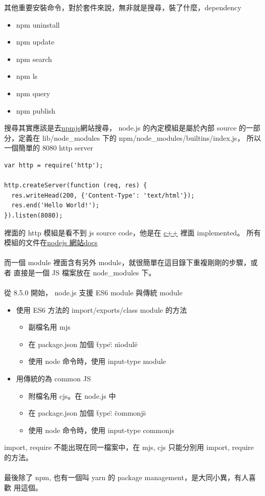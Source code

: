   其他重要安裝命令，對於套件來說，無非就是搜尋，裝了什麼，dependency
  \begin{itemize}
    \item npm uninstall
    \item npm update
    \item npm search
    \item npm ls
    \item npm query
    \item npm publish
  \end{itemize}
  搜尋其實應該是去\href{https://www.npmjs.com/}{npmjs}網站搜尋，
  node.js 的內定模組是屬於內部 source 的一部分，定義在 lib/node\_modules 下的
  npm/node\_modules/builtins/index.js， 所以一個簡單的 8080 http server
  \begin{verbatim}
var http = require('http');

http.createServer(function (req, res) {
  res.writeHead(200, {'Content-Type': 'text/html'});
  res.end('Hello World!');
}).listen(8080);
  \end{verbatim}
  裡面的 http 模組是看不到 js source code，他是在
  \href{https://github.com/nodejs/node/tree/main/src}{c++} 裡面 implemented。
  所有模組的文件在\href{https://nodejs.org/docs/latest/api/}{nodejs 網站docs}
  \\\\
  而一個 module 裡面含有另外 module，就很簡單在這目錄下重複剛剛的步驟，或者
  直接是一個 JS 檔案放在 node\_modules 下。
  \\\\
  從 8.5.0 開始， node.js 支援 ES6 module 與傳統 module
  \begin{itemize}
    \item 使用 ES6 方法的 import/exports/class module 的方法 
      \begin{itemize}
        \item 副檔名用 mjs
        \item 在 package.json 加個 \"type\" : \"module\"
        \item 使用 node 命令時，使用 \-\-input-type module
      \end{itemize}
    \item 用傳統的為 common JS
      \begin{itemize}
        \item 附檔名用 cjs。在 node.js 中
        \item 在 package.json 加個 \"type\" : \"commonjs\"
        \item 使用 node 命令時，使用 \-\-input-type commonjs
      \end{itemize}
  \end{itemize}
  import, require 不能出現在同一檔案中，在 mjs, cjs 只能分別用 import, require
  的方法。
  \\\\
  最後除了 npm, 也有一個叫 yarn 的 package management，是大同小異，有人喜歡
  用這個。

